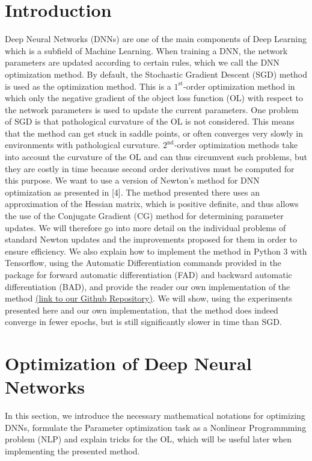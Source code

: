 \documentclass[conference]{IEEEtran}
\begin{document}
\section{Introduction} 
Deep Neural Networks (DNNs) are one of the main components of Deep Learning which is a subfield of Machine Learning. When training a DNN, the network parameters are updated according to certain rules, which we call the DNN optimization method. By default, the Stochastic Gradient Descent (SGD) method is used as the optimization method. This is a $1^{\text{st}}$-order optimization method in which only the negative gradient of the object loss function (OL) with respect to the network parameters is used to update the current parameters.
One problem of SGD is that pathological curvature of the OL is not considered. This means that the method can get stuck in saddle points, or often converges very slowly in environments with pathological curvature. 
$2^{\text{nd}}$-order optimization methods take into account the curvature of the OL and can thus circumvent such problems, but they are costly in time because second order derivatives must be computed for this purpose. 
We want to use a version of Newton's method for DNN optimization as presented in [4].
The method presented there uses an approximation of the Hessian matrix, which is positive definite, and thus allows the use of the Conjugate Gradient (CG) method for determining parameter updates. We will therefore go into more detail on the individual problems of standard Newton updates and the improvements proposed for them in order to ensure efficiency.
We also explain how to implement the method in Python 3 with Tensorflow, using the Automatic Differentiation commands provided in the package for forward automatic differentiation (FAD) and backward automatic differentiation (BAD), and provide the reader our own implementation of the method \href{https://github.com/NiklasBrunn/NumOpt_project}{(link to our Github Repository)}. We will show, using the experiments presented here and our own implementation, that the method does indeed converge in fewer epochs, but is still significantly slower in time than SGD.


\section{Optimization of Deep Neural Networks}
In this section, we introduce the necessary mathematical notations for optimizing DNNs, formulate the Parameter optimization task as a Nonlinear Programmming problem (NLP) and explain tricks for the OL, which will be useful later when implementing the presented method.\\
\end{document}
